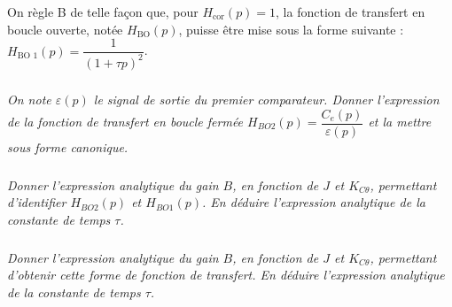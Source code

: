 \documentclass[10pt,fleqn]{article} %
\begin{document}
\begin{multicols}{2}
On règle B de telle façon que, pour $H_{\text{cor}}(p)=1$, la fonction de transfert en boucle ouverte, notée $H_{\text{BO}}(p)$, puisse être mise sous la forme suivante : 
$H_{\text{BO 1}}(p)=\dfrac{1}{\left(1+\tau p\right)^2}$.



\subparagraph{}
\textit{On note $\varepsilon(p)$ le signal de sortie du premier comparateur. Donner l’expression de la fonction de transfert en boucle fermée $H_{BO 2}(p)=\dfrac{C_e(p)}{\varepsilon(p)}$ et la mettre sous forme canonique.}

\subparagraph{}
\textit{Donner l’expression analytique du gain $B$, en fonction de $J$ et $K_{C\theta}$, permettant d'identifier $H_{BO 2}(p)$ et $H_{BO 1}(p)$. En déduire l’expression analytique de la constante de temps $\tau$.}
\ifprof
\begin{corrige}
\end{corrige}
\else
\fi


\subparagraph{}
\textit{Donner l’expression analytique du gain $B$, en fonction de $J$ et $K_{C\theta}$, permettant d’obtenir cette
forme de fonction de transfert. En déduire l’expression analytique de la constante de temps $\tau$.}
\ifprof
\begin{corrige}
\end{corrige}
\else
\fi


\end{multicols}
\end{document}
